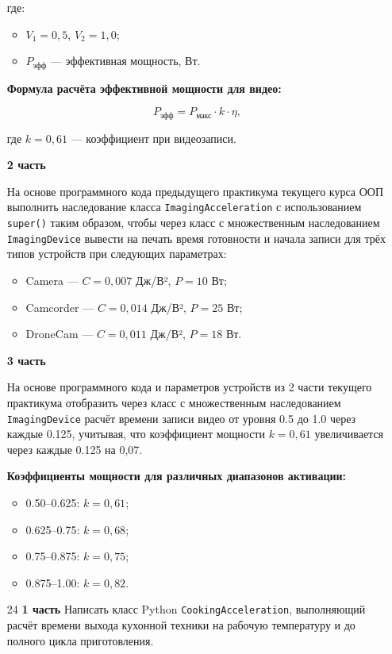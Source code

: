 \begin{enumerate}
где:  
\begin{itemize}
    \item $V_1 = 0{,}5$, $V_2 = 1{,}0$;  
    \item $P_{\text{эфф}}$ — эффективная мощность, Вт.  
\end{itemize}

\textbf{Формула расчёта эффективной мощности для видео:}

\begin{equation}
P_{\text{эфф}} = P_{\text{макс}} \cdot k \cdot \eta,
\end{equation}

где $k = 0{,}61$ — коэффициент при видеозаписи.

\textbf{2 часть}

На основе программного кода предыдущего практикума текущего курса ООП выполнить наследование класса \texttt{ImagingAcceleration} с использованием \texttt{super()} таким образом, чтобы через класс с множественным наследованием \texttt{ImagingDevice} вывести на печать время готовности и начала записи для трёх типов устройств при следующих параметрах:

\begin{itemize}
    \item Camera — $C = 0{,}007$ Дж/В², $P = 10$ Вт;  
    \item Camcorder — $C = 0{,}014$ Дж/В², $P = 25$ Вт;  
    \item DroneCam — $C = 0{,}011$ Дж/В², $P = 18$ Вт.  
\end{itemize}

\textbf{3 часть}

На основе программного кода и параметров устройств из 2 части текущего практикума отобразить через класс с множественным наследованием \texttt{ImagingDevice} расчёт времени записи видео от уровня 0.5 до 1.0 через каждые 0.125, учитывая, что коэффициент мощности $k = 0{,}61$ увеличивается через каждые 0.125 на 0{,}07.

\textbf{Коэффициенты мощности для различных диапазонов активации:}
\begin{itemize}
    \item 0.50–0.625: $k = 0{,}61$;  
    \item 0.625–0.75: $k = 0{,}68$;  
    \item 0.75–0.875: $k = 0{,}75$;  
    \item 0.875–1.00: $k = 0{,}82$.  
\end{itemize}


\item[24] \textbf{1 часть}  
Написать класс Python \texttt{CookingAcceleration}, выполняющий расчёт времени выхода кухонной техники на рабочую температуру и до полного цикла приготовления.


\end{enumerate}
